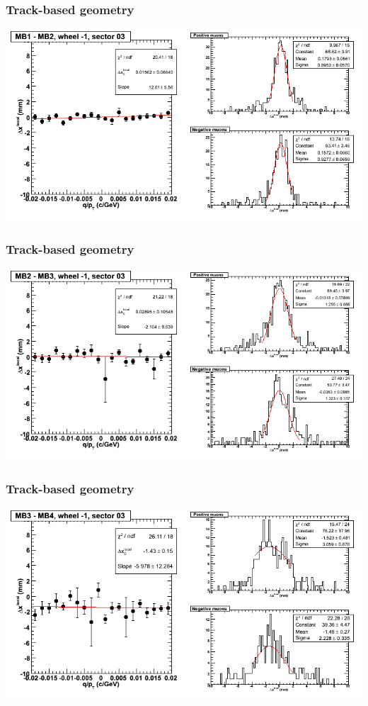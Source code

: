 \documentclass[compress]{beamer}
\begin{document}
\begin{frame}
\frametitle{Track-based geometry}
\includegraphics[width=\linewidth]{NOV4_segdiffs/dt13_resid_B_03_12.png}
\end{frame}

\begin{frame}
\frametitle{Track-based geometry}
\includegraphics[width=\linewidth]{NOV4_segdiffs/dt13_resid_B_03_23.png}
\end{frame}

\begin{frame}
\frametitle{Track-based geometry}
\includegraphics[width=\linewidth]{NOV4_segdiffs/dt13_resid_B_03_34.png}
\end{frame}
\end{document}
